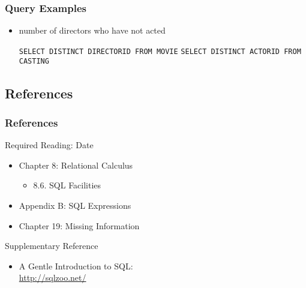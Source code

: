 \documentclass[dvipsnames]{beamer}
\theoremstyle{plain}
\begin{document}
\begin{frame}[fragile]
  \frametitle{Query Examples}

  \begin{itemize}
    \item number of directors who have not acted

    \medskip
{}
\lstinline!SELECT DISTINCT DIRECTORID FROM MOVIE!
\lstinline!SELECT DISTINCT ACTORID FROM CASTING!
  \end{itemize}
\end{frame}

\subsection*{References}

\begin{frame}
  \frametitle{References}

  \begin{block}{Required Reading: Date}
    \begin{itemize}
      \item Chapter 8: Relational Calculus
      \begin{itemize}
        \item 8.6. \alert{SQL Facilities}
      \end{itemize}

      \item Appendix B: \alert{SQL Expressions}
      \item Chapter 19: Missing Information
    \end{itemize}
  \end{block}

  \begin{block}{Supplementary Reference}
    \begin{itemize}
      \item A Gentle Introduction to SQL:\\
        \url{http://sqlzoo.net/}
    \end{itemize}
  \end{block}
\end{frame}
\end{document}
